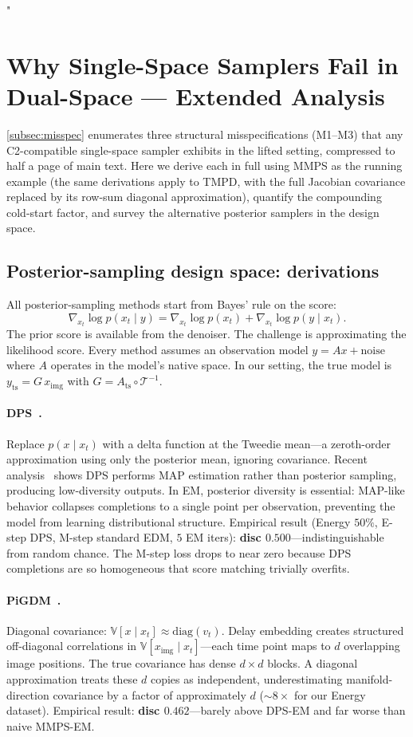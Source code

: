 "\documentclass{article}
\theoremstyle{plain}
\theoremstyle{definition}
\theoremstyle{remark}
\newcommand{\imgts}{\mathcal{T}^{-1}}
\newcommand{\Ats}{A_{\mathrm{ts}}}
\newcommand{\yts}{y_{\mathrm{ts}}}
\newcommand{\ximg}{x_{\mathrm{img}}}
\begin{document}
\section{Why Single-Space Samplers Fail in Dual-Space --- Extended Analysis}
\label{app:mmps-fails}

\cref{subsec:misspec} enumerates three structural misspecifications (M1--M3) that any C2-compatible single-space sampler exhibits in the lifted setting, compressed to half a page of main text. Here we derive each in full using MMPS as the running example (the same derivations apply to TMPD, with the full Jacobian covariance replaced by its row-sum diagonal approximation), quantify the compounding cold-start factor, and survey the alternative posterior samplers in the design space.

\subsection{Posterior-sampling design space: derivations}
\label{app:sampler-design-space}

All posterior-sampling methods start from Bayes' rule on the score:
$$
\nabla_{x_t} \log p(x_t \mid y) = \nabla_{x_t} \log p(x_t) + \nabla_{x_t} \log p(y \mid x_t).
$$
The prior score is available from the denoiser. The challenge is approximating the likelihood score. Every method assumes an observation model $y = Ax + \mathrm{noise}$ where $A$ operates in the model's native space. In our setting, the true model is $\yts = G\,\ximg$ with $G = \Ats \circ \imgts$.

\paragraph{DPS~\citep{chung2023dps}.}
Replace $p(x \mid x_t)$ with a delta function at the Tweedie mean---a zeroth-order approximation using only the posterior mean, ignoring covariance. Recent analysis~\citep{luo2025rethinking} shows DPS performs MAP estimation rather than posterior sampling, producing low-diversity outputs. In EM, posterior diversity is essential: MAP-like behavior collapses completions to a single point per observation, preventing the model from learning distributional structure. Empirical result (Energy $50\%$, E-step DPS, M-step standard EDM, $5$ EM iters): \textbf{disc $0.500$}---indistinguishable from random chance. The M-step loss drops to near zero because DPS completions are so homogeneous that score matching trivially overfits.

\paragraph{PiGDM~\citep{song2023pigdm}.}
Diagonal covariance: $\mathbb{V}[x \mid x_t] \approx \mathrm{diag}(v_t)$. Delay embedding creates structured off-diagonal correlations in $\mathbb{V}[\ximg \mid x_t]$---each time point maps to $d$ overlapping image positions. The true covariance has dense $d \times d$ blocks. A diagonal approximation treats these $d$ copies as independent, underestimating manifold-direction covariance by a factor of approximately $d$ (${\sim}8\times$ for our Energy dataset). Empirical result: \textbf{disc $0.462$}---barely above DPS-EM and far worse than naive MMPS-EM.
\end{document}
